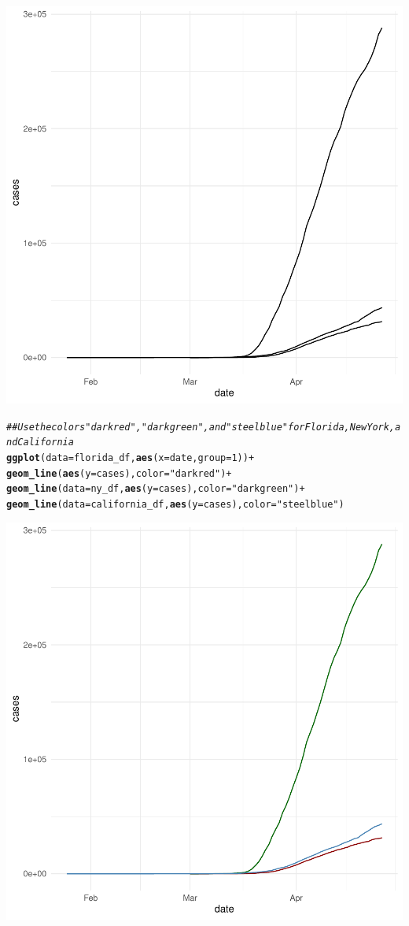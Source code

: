 \documentclass{article}\usepackage[]{graphicx}\usepackage[]{color}
\makeatletter
\newcommand{\hlnum}[1]{\textcolor[rgb]{0.686,0.059,0.569}{#1}}%
\newcommand{\hlstr}[1]{\textcolor[rgb]{0.192,0.494,0.8}{#1}}%
\newcommand{\hlcom}[1]{\textcolor[rgb]{0.678,0.584,0.686}{\textit{#1}}}%
\newcommand{\hlopt}[1]{\textcolor[rgb]{0,0,0}{#1}}%
\newcommand{\hlstd}[1]{\textcolor[rgb]{0.345,0.345,0.345}{#1}}%
\newcommand{\hlkwc}[1]{\textcolor[rgb]{0.333,0.667,0.333}{#1}}%
\newcommand{\hlkwd}[1]{\textcolor[rgb]{0.737,0.353,0.396}{\textbf{#1}}}%
\newenvironment{kframe}{%
 \def\at@end@of@kframe{}%
 \ifinner\ifhmode%
  \def\at@end@of@kframe{\end{minipage}}%
  \begin{minipage}{\columnwidth}%
 \fi\fi%
 \def\FrameCommand##1{\hskip\@totalleftmargin \hskip-\fboxsep
 \colorbox{shadecolor}{##1}\hskip-\fboxsep
     \hskip-\linewidth \hskip-\@totalleftmargin \hskip\columnwidth}%
 \MakeFramed {\advance\hsize-\width
   \@totalleftmargin\z@ \linewidth\hsize
   \@setminipage}}%
 {\par\unskip\endMakeFramed%
 \at@end@of@kframe}
\newenvironment{knitrout}{}{} %
\makeatother
\begin{document}
\begin{knitrout}
{\centering \includegraphics[width=.6\linewidth]{figure/assignment-04-WilsonStewart-Rnwauto-report-7} 

}


\begin{kframe}\begin{alltt}
\hlcom{## Use the colors "darkred", "darkgreen", and "steelblue" for Florida, New York, and California}
\hlkwd{ggplot}\hlstd{(}\hlkwc{data}\hlstd{=florida_df,} \hlkwd{aes}\hlstd{(}\hlkwc{x}\hlstd{=date,} \hlkwc{group}\hlstd{=}\hlnum{1}\hlstd{))} \hlopt{+}
  \hlkwd{geom_line}\hlstd{(}\hlkwd{aes}\hlstd{(}\hlkwc{y} \hlstd{= cases),} \hlkwc{color} \hlstd{=} \hlstr{"darkred"}\hlstd{)} \hlopt{+}
  \hlkwd{geom_line}\hlstd{(}\hlkwc{data}\hlstd{=ny_df,} \hlkwd{aes}\hlstd{(}\hlkwc{y} \hlstd{= cases),} \hlkwc{color}\hlstd{=}\hlstr{"darkgreen"}\hlstd{)} \hlopt{+}
  \hlkwd{geom_line}\hlstd{(}\hlkwc{data}\hlstd{=california_df,} \hlkwd{aes}\hlstd{(}\hlkwc{y} \hlstd{= cases),} \hlkwc{color}\hlstd{=}\hlstr{"steelblue"}\hlstd{)}
\end{alltt}
\end{kframe}

{\centering \includegraphics[width=.6\linewidth]{figure/assignment-04-WilsonStewart-Rnwauto-report-8} 

}
\end{knitrout}
\end{document}
